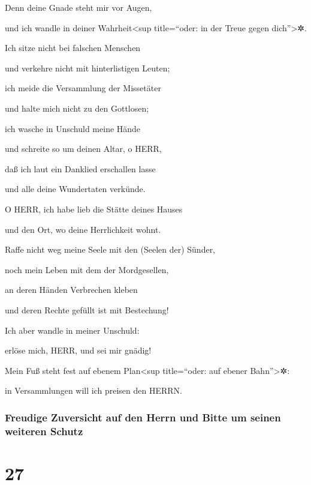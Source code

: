 Denn deine Gnade steht mir vor Augen,

und ich wandle in deiner Wahrheit\textless sup title=``oder: in der
Treue gegen dich''\textgreater✲.

Ich sitze nicht bei falschen Menschen

und verkehre nicht mit hinterlistigen Leuten;

ich meide die Versammlung der Missetäter

und halte mich nicht zu den Gottlosen;

ich wasche in Unschuld meine Hände

und schreite so um deinen Altar, o HERR,

daß ich laut ein Danklied erschallen lasse

und alle deine Wundertaten verkünde.

O HERR, ich habe lieb die Stätte deines Hauses

und den Ort, wo deine Herrlichkeit wohnt.

Raffe nicht weg meine Seele mit den (Seelen der) Sünder,

noch mein Leben mit dem der Mordgesellen,

an deren Händen Verbrechen kleben

und deren Rechte gefüllt ist mit Bestechung!

Ich aber wandle in meiner Unschuld:

erlöse mich, HERR, und sei mir gnädig!

Mein Fuß steht fest auf ebenem Plan\textless sup
title=``oder: auf ebener Bahn''\textgreater✲:

in Versammlungen will ich preisen den HERRN.

\hypertarget{freudige-zuversicht-auf-den-herrn-und-bitte-um-seinen-weiteren-schutz}{%
\subsubsection{Freudige Zuversicht auf den Herrn und Bitte um seinen
weiteren
Schutz}\label{freudige-zuversicht-auf-den-herrn-und-bitte-um-seinen-weiteren-schutz}}

\hypertarget{section-26}{%
\section{27}\label{section-26}}

